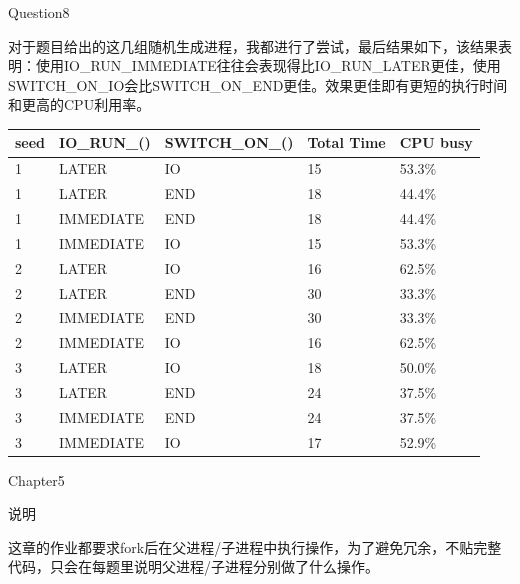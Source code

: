 \documentclass[12pt]{article}
\begin{document}
\begin{large}
    \noindent Question8\\
\end{large}
\hspace*{2em}对于题目给出的这几组随机生成进程，我都进行了尝试，最后结果如下，该结果表明：使用IO\_RUN\_IMMEDIATE往往会表现得比IO\_RUN\_LATER更佳，使用SWITCH\_ON\_IO会比SWITCH\_ON\_END更佳。效果更佳即有更短的执行时间和更高的CPU利用率。\\
\vspace*{2cm}
\begin{tabular}{p{2cm}p{3cm}p{3.5cm}p{2cm}p{2cm}}  %
    \toprule[2pt]
    seed & IO\_RUN\_() & SWITCH\_ON\_() & Total Time & CPU busy \\ %
    \midrule[2pt]
    1    & LATER       & IO             & 15         & 53.3\%   \\
    1    & LATER       & END            & 18         & 44.4\%   \\
    1    & IMMEDIATE   & END            & 18         & 44.4\%   \\
    1    & IMMEDIATE   & IO             & 15         & 53.3\%   \\
    2    & LATER       & IO             & 16         & 62.5\%   \\
    2    & LATER       & END            & 30         & 33.3\%   \\
    2    & IMMEDIATE   & END            & 30         & 33.3\%   \\
    2    & IMMEDIATE   & IO             & 16         & 62.5\%   \\
    3    & LATER       & IO             & 18         & 50.0\%   \\
    3    & LATER       & END            & 24         & 37.5\%   \\
    3    & IMMEDIATE   & END            & 24         & 37.5\%   \\
    3    & IMMEDIATE   & IO             & 17         & 52.9\%   \\
    \bottomrule[2pt]
\end{tabular}
\newpage
\begin{LARGE}
    \noindent Chapter5\\
\end{LARGE}
\begin{Large}
    \noindent 说明\\
\end{Large}
\hspace*{2em}这章的作业都要求fork后在父进程/子进程中执行操作，为了避免冗余，不贴完整代码，只会在每题里说明父进程/子进程分别做了什么操作。\\
\end{document}
